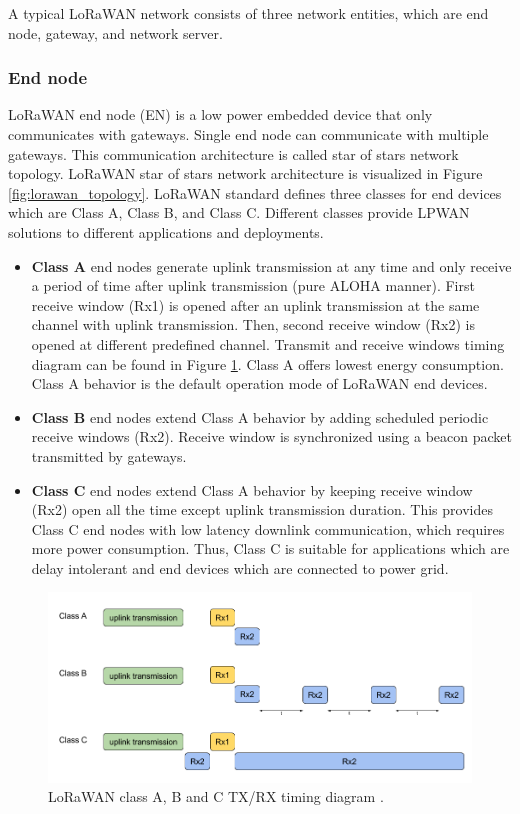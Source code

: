 A typical LoRaWAN network consists of three network entities, which are end node, gateway, and network server.

\subsubsection{End node}

LoRaWAN end node (EN) is a low power embedded device that only communicates with gateways. Single end node can communicate with multiple gateways. This communication architecture is called star of stars network topology. LoRaWAN star of stars network architecture is visualized in Figure \ref{fig:lorawan_topology}. LoRaWAN standard defines three classes for end devices which are Class A, Class B, and Class C. Different classes provide LPWAN solutions to different applications and deployments.

\begin{itemize}
  \item \textbf{Class A} end nodes generate uplink transmission at any time and only receive a period of time after uplink transmission (pure ALOHA manner). First receive window (Rx1) is opened after an uplink transmission at the same channel with uplink transmission. Then, second receive window (Rx2) is opened at different predefined channel. Transmit and receive windows timing diagram can be found in Figure \ref{fig:lorawan_class}. Class A offers lowest energy consumption. Class A behavior is the default operation mode of LoRaWAN end devices.
  \item \textbf{Class B} end nodes extend Class A behavior by adding scheduled periodic receive windows (Rx2). Receive window is synchronized using a beacon packet transmitted by gateways.
  \item \textbf{Class C} end nodes extend Class A behavior by keeping receive window (Rx2) open all the time except uplink transmission duration. This provides Class C end nodes with low latency downlink communication, which requires more power consumption. Thus, Class C is suitable for applications which are delay intolerant and end devices which are connected to power grid.
\end{itemize}

\begin{figure}
\centering
\includegraphics[width=\linewidth]{fig/lorawan_class.png}
\vspace*{4mm}
\caption{LoRaWAN class A, B and C TX/RX timing diagram \cite{witekio}.}
\label{fig:lorawan_class}
\end{figure}

